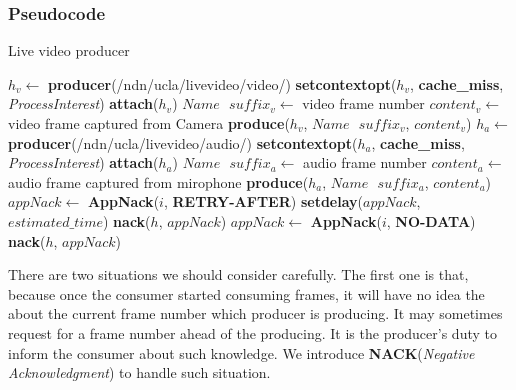 \subsubsection{Pseudocode}

\begin{algorithm}%
\caption{Live video producer}
\label{alg:liveproducer}
\begin{algorithmic}[1]
\State $h_v \leftarrow $ \textbf{producer}(/ndn/ucla/livevideo/video/)
\State \textbf{setcontextopt}($h_v$, \textbf{cache\_miss}, \textit{ProcessInterest})
\State \textbf{attach}($h_v$)
\vspace{0.2cm}
	\State $Name \textbf{ } suffix_v \leftarrow $ video frame number
	\State $content_v \leftarrow $ video frame captured from Camera
	\State \textbf{produce}($h_v$, $Name\textbf{ }suffix_v$, $content_v$)
	\EndWhile
\vspace{0.2cm}
\vspace{0.2cm}
\State $h_a \leftarrow $ \textbf{producer}(/ndn/ucla/livevideo/audio/)
\State \textbf{setcontextopt}($h_a$, \textbf{cache\_miss}, \textit{ProcessInterest})
\State \textbf{attach}($h_a$)
\vspace{0.2cm}
	\State $Name \textbf{ } suffix_a \leftarrow $ audio frame number
	\State $content_a \leftarrow $ audio frame captured from mirophone
	\State \textbf{produce}($h_a$, $Name\textbf{ }suffix_a$, $content_a$)
	\EndWhile
\vspace{0.4cm}
    \State $appNack \leftarrow $ \textbf{AppNack}($i$, \textbf{RETRY-AFTER})
    \State \textbf{setdelay}($appNack$, $estimated\_time$)
    \State \textbf{nack}($h$, $appNack$)
  \EndIf
    \State $appNack \leftarrow $ \textbf{AppNack}($i$, \textbf{NO-DATA})
    \State \textbf{nack}($h$, $appNack$)
  \EndIf
\EndFunction
\end{algorithmic}
\end{algorithm}

There are two situations we should consider carefully. The first one is that, because once the consumer started consuming frames, it will have no idea the about the current frame number which producer is producing. It may sometimes request for a frame number ahead of the producing. It is the producer's duty to inform the consumer about such knowledge. We introduce \textbf{NACK}(\textit{Negative Acknowledgment}) to handle such situation. 

